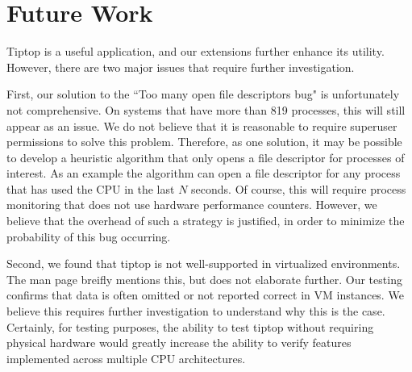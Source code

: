 \section{Future Work}
\label{sec:conclusion}
Tiptop is a useful application, and our extensions further enhance its utility.
However, there are two major issues that require further investigation.

First, our solution to the ``Too many open file descriptors bug" is unfortunately not comprehensive. On systems that have more than 819 processes, this will still appear as an issue.
We do not believe that it is reasonable to require superuser permissions to solve this problem.
Therefore, as one solution, it may be possible to develop a heuristic algorithm that only opens a file descriptor for processes of interest.
As an example the algorithm can open a file descriptor for any process that has used the CPU in the last $N$ seconds.
Of course, this will require process monitoring that does not use hardware performance counters.
However, we believe that the overhead of such a strategy is justified, in order to minimize the probability of this bug occurring.

Second, we found that tiptop is not well-supported in virtualized environments.
The man page breifly mentions this, but does not elaborate further.
Our testing confirms that data is often omitted or not reported correct in VM instances.
We believe this requires further investigation to understand why this is the case.
Certainly, for testing purposes, the ability to test tiptop without requiring physical hardware would greatly increase the ability to verify features implemented across multiple CPU architectures.